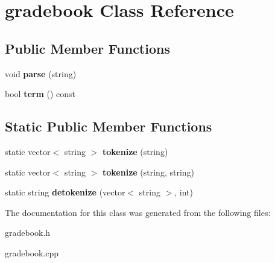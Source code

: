 \hypertarget{classgradebook}{}\section{gradebook Class Reference}
\label{classgradebook}
\subsection*{Public Member Functions}
\begin{DoxyCompactItemize}
\item 
void {\bfseries parse} (string)\hypertarget{classgradebook_a7b788971e27b3eb61c84099fd5cb6a8f}{}\label{classgradebook_a7b788971e27b3eb61c84099fd5cb6a8f}

\item 
bool {\bfseries term} () const \hypertarget{classgradebook_aa5f16f0ba62a67fb9eca03f68dc1483a}{}\label{classgradebook_aa5f16f0ba62a67fb9eca03f68dc1483a}

\end{DoxyCompactItemize}
\subsection*{Static Public Member Functions}
\begin{DoxyCompactItemize}
\item 
static vector$<$ string $>$ {\bfseries tokenize} (string)\hypertarget{classgradebook_a30aea9e4eb55ce4eb04c66b77bbf0c11}{}\label{classgradebook_a30aea9e4eb55ce4eb04c66b77bbf0c11}

\item 
static vector$<$ string $>$ {\bfseries tokenize} (string, string)\hypertarget{classgradebook_aebfadcb2ec8a03ba7a166abb2983893e}{}\label{classgradebook_aebfadcb2ec8a03ba7a166abb2983893e}

\item 
static string {\bfseries detokenize} (vector$<$ string $>$, int)\hypertarget{classgradebook_ae8c19ab3c4641fc6c7fea1cff667e281}{}\label{classgradebook_ae8c19ab3c4641fc6c7fea1cff667e281}

\end{DoxyCompactItemize}


The documentation for this class was generated from the following files\+:\begin{DoxyCompactItemize}
\item 
gradebook.\+h\item 
gradebook.\+cpp\end{DoxyCompactItemize}
